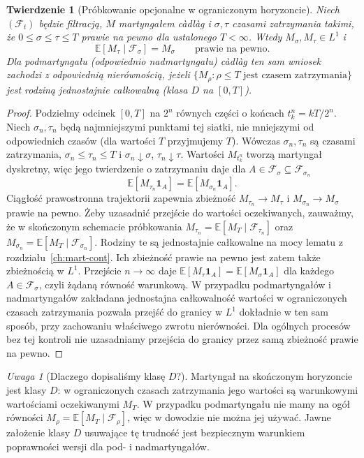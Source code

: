 \documentclass[11pt,a4paper,oneside]{report}
\numberwithin{equation}{chapter}
\theoremstyle{plain}
\newtheorem{twierdzenie}{Twierdzenie}[chapter]
\theoremstyle{definition}
\theoremstyle{remark}
\newtheorem{uwaga}{Uwaga}[chapter]
\newcommand{\E}{\mathbb{E}}
\newcommand{\calF}{\mathcal{F}}
\newcommand{\ind}[1]{\mathbf{1}_{#1}}
\begin{document}
\begin{twierdzenie}[Próbkowanie opcjonalne w ograniczonym horyzoncie]
\label{thm:ost-cont}
Niech $(\calF_t)$ będzie filtracją, $M$ martyngałem
c\`adl\`ag i $\sigma,\tau$ czasami zatrzymania takimi,
że $0\le\sigma\le\tau\le T$ prawie na pewno dla ustalonego
$T<\infty$. Wtedy $M_\sigma,M_\tau\in L^1$ i
\[
\E[M_\tau\mid\calF_\sigma]=M_\sigma
\qquad\text{prawie na pewno}.
\]
Dla podmartyngału (odpowiednio nadmartyngału) c\`adl\`ag
ten sam wniosek zachodzi z odpowiednią nierównością,
jeżeli $\{M_\rho:\rho\le T\text{ jest czasem zatrzymania}\}$
jest rodziną jednostajnie całkowalną (klasa $D$
na $[0,T]$).
\end{twierdzenie}
\begin{proof}
Podzielmy odcinek $[0,T]$ na $2^n$ równych części
o końcach $t_k^n=kT/2^n$. Niech $\sigma_n,\tau_n$
będą najmniejszymi punktami tej siatki, nie mniejszymi
od odpowiednich czasów (dla wartości $T$ przyjmujemy $T$).
Wówczas $\sigma_n,\tau_n$ są czasami zatrzymania,
$\sigma_n\le\tau_n\le T$ i
$\sigma_n\downarrow\sigma$, $\tau_n\downarrow\tau$.
Wartości $M_{t_k^n}$ tworzą martyngał dyskretny, więc
jego twierdzenie o zatrzymaniu daje dla
$A\in\calF_\sigma\subseteq\calF_{\sigma_n}$
\[
\E[M_{\tau_n}\ind A]=\E[M_{\sigma_n}\ind A].
\]
Ciągłość prawostronna trajektorii zapewnia zbieżność
$M_{\tau_n}\to M_\tau$ i $M_{\sigma_n}\to M_\sigma$
prawie na pewno. Żeby uzasadnić przejście do wartości
oczekiwanych, zauważmy, że w skończonym schemacie próbkowania
$M_{\tau_n}=\E[M_T\mid\calF_{\tau_n}]$ oraz
$M_{\sigma_n}=\E[M_T\mid\calF_{\sigma_n}]$.
Rodziny te są jednostajnie całkowalne na mocy lematu
z rozdziału~\ref{ch:mart-cont}. Ich zbieżność prawie na pewno
jest zatem także zbieżnością w $L^1$.
Przejście $n\to\infty$ daje
$\E[M_\tau\ind A]=\E[M_\sigma\ind A]$ dla każdego
$A\in\calF_\sigma$, czyli żądaną równość warunkową.
W przypadku podmartyngałów i nadmartyngałów
zakładana jednostajna całkowalność wartości w ograniczonych
czasach zatrzymania pozwala przejść do granicy w $L^1$
dokładnie w ten sam sposób, przy zachowaniu właściwego
zwrotu nierówności. Dla ogólnych procesów bez tej
kontroli nie uzasadniamy przejścia do granicy przez
samą zbieżność prawie na pewno.
\end{proof}

\begin{uwaga}[Dlaczego dopisaliśmy klasę $D$?]
Martyngał na skończonym horyzoncie jest klasy $D$:
w ograniczonych czasach zatrzymania jego wartości są
warunkowymi wartościami oczekiwanymi $M_T$.
W przypadku podmartyngału nie mamy na ogół równości
$M_\rho=\E[M_T\mid\calF_\rho]$, więc w dowodzie
nie można jej używać. Jawne założenie klasy $D$
usuwające tę trudność jest bezpiecznym warunkiem
poprawności wersji dla pod- i nadmartyngałów.
\end{uwaga}
\end{document}
